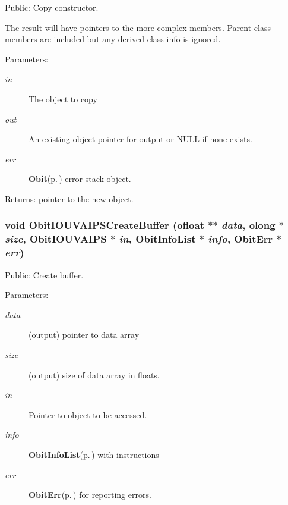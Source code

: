 Public: Copy constructor. 

The result will have pointers to the more complex members. Parent class members are included but any derived class info is ignored. \begin{Desc}
\item[Parameters:]
\begin{description}
\item[{\em in}]The object to copy \item[{\em out}]An existing object pointer for output or NULL if none exists. \item[{\em err}]{\bf Obit}{\rm (p.\,\pageref{structObit})} error stack object. \end{description}
\end{Desc}
\begin{Desc}
\item[Returns:]pointer to the new object. \end{Desc}
\subsubsection{\setlength{\rightskip}{0pt plus 5cm}void Obit\-IOUVAIPSCreate\-Buffer ({\bf ofloat} $\ast$$\ast$ {\em data}, {\bf olong} $\ast$ {\em size}, {\bf Obit\-IOUVAIPS} $\ast$ {\em in}, {\bf Obit\-Info\-List} $\ast$ {\em info}, {\bf Obit\-Err} $\ast$ {\em err})}\label{ObitIOUVAIPS_8c_a29}


Public: Create buffer. 

\begin{Desc}
\item[Parameters:]
\begin{description}
\item[{\em data}](output) pointer to data array \item[{\em size}](output) size of data array in floats. \item[{\em in}]Pointer to object to be accessed. \item[{\em info}]{\bf Obit\-Info\-List}{\rm (p.\,\pageref{structObitInfoList})} with instructions \item[{\em err}]{\bf Obit\-Err}{\rm (p.\,\pageref{structObitErr})} for reporting errors. \end{description}
\end{Desc}
